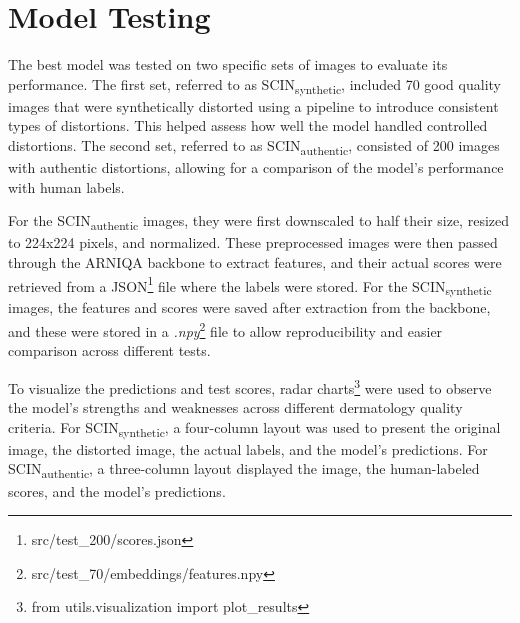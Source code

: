 \section{Model Testing}
\label{sec:ModelTesting}
The best model was tested on two specific sets of images to evaluate its performance. The first set, referred to as SCIN\textsubscript{synthetic}, included 70 good quality images that were synthetically distorted using a pipeline to introduce consistent types of distortions. This helped assess how well the model handled controlled distortions. The second set, referred to as SCIN\textsubscript{authentic}, consisted of 200 images with authentic distortions, allowing for a comparison of the model’s performance with human labels. \par
\vspace{\baselineskip}
\noindent
For the SCIN\textsubscript{authentic} images, they were first downscaled to half their size, resized to 224x224 pixels, and normalized. These preprocessed images were then passed through the ARNIQA backbone to extract features, and their actual scores were retrieved from a JSON\footnote{src/test\_200/scores.json} file where the labels were stored. For the SCIN\textsubscript{synthetic} images, the features and scores were saved after extraction from the backbone, and these were stored in a \textit{.npy}\footnote{src/test\_70/embeddings/features.npy} file to allow reproducibility and easier comparison across different tests. \par
\vspace{\baselineskip}
\noindent
To visualize the predictions and test scores, radar charts\footnote{from utils.visualization import plot\_results} were used to observe the model’s strengths and weaknesses across different dermatology quality criteria. For SCIN\textsubscript{synthetic}, a four-column layout was used to present the original image, the distorted image, the actual labels, and the model’s predictions. For SCIN\textsubscript{authentic}, a three-column layout displayed the image, the human-labeled scores, and the model’s predictions. \par

